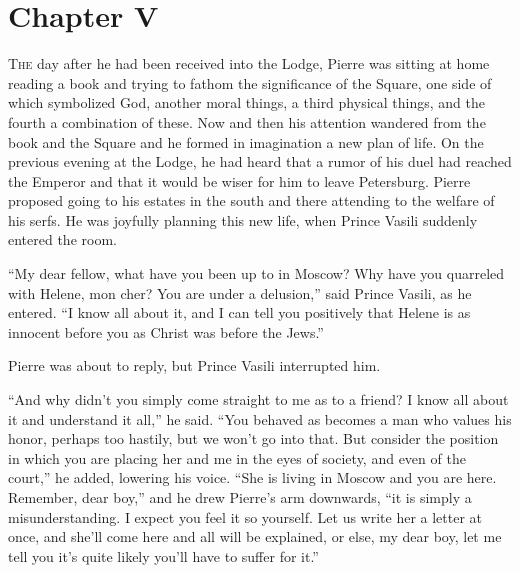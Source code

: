
\chapter*{Chapter V}
\ifaudio     
{} 
\fi

\lettrine[lines=2, loversize=0.3, lraise=0]{\initfamily T}{he}
day after he had been received into the Lodge, Pierre was
sitting at home reading a book and trying to fathom the
significance of the Square, one side of which symbolized God,
another moral things, a third physical things, and the fourth a
combination of these. Now and then his attention wandered from
the book and the Square and he formed in imagination a new plan
of life. On the previous evening at the Lodge, he had heard that
a rumor of his duel had reached the Emperor and that it would be
wiser for him to leave Petersburg. Pierre proposed going to his
estates in the south and there attending to the welfare of his
serfs. He was joyfully planning this new life, when Prince Vasili
suddenly entered the room.

``My dear fellow, what have you been up to in Moscow? Why have
you quarreled with Helene, mon cher? You are under a delusion,''
said Prince Vasili, as he entered. ``I know all about it, and I
can tell you positively that Helene is as innocent before you as
Christ was before the Jews.''

Pierre was about to reply, but Prince Vasili interrupted him.

``And why didn't you simply come straight to me as to a friend? I
know all about it and understand it all,'' he said. ``You behaved
as becomes a man who values his honor, perhaps too hastily, but
we won't go into that. But consider the position in which you are
placing her and me in the eyes of society, and even of the
court,'' he added, lowering his voice. ``She is living in Moscow
and you are here. Remember, dear boy,'' and he drew Pierre's arm
downwards, ``it is simply a misunderstanding. I expect you feel
it so yourself. Let us write her a letter at once, and she'll
come here and all will be explained, or else, my dear boy, let me
tell you it's quite likely you'll have to suffer for it.''

